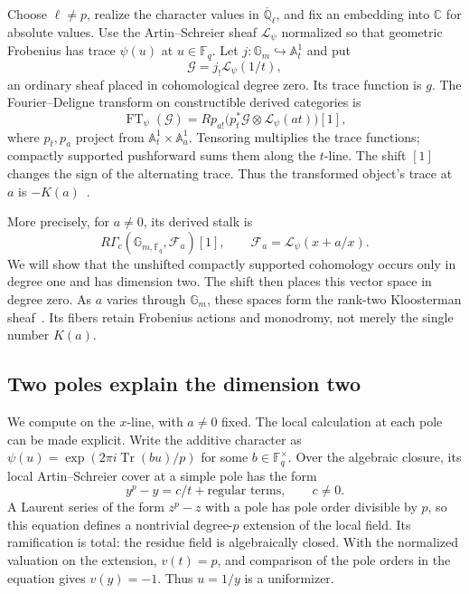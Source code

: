 \documentclass[11pt]{article}
\theoremstyle{remark}
\begin{document}
Choose \(\ell\ne p\), realize the character values in \(\overline{\mathbb Q}_\ell\), and fix an embedding into \(\mathbb C\) for absolute values. Use the Artin--Schreier sheaf \(\mathcal L_\psi\) normalized so that geometric Frobenius has trace \(\psi(u)\) at \(u\in\mathbb F_q\). Let \(j:\mathbb G_m\hookrightarrow\mathbb A^1_t\) and put
\[
\mathcal G=j_!\mathcal L_\psi(1/t),
\]
an ordinary sheaf placed in cohomological degree zero. Its trace function is \(g\). The Fourier--Deligne transform on constructible derived categories is
\begin{equation}
\operatorname{FT}_\psi(\mathcal G)
=Rp_{a!}\bigl(p_t^*\mathcal G\otimes
\mathcal L_\psi(at)\bigr)[1],
\label{estimate:fourier-deligne}
\end{equation}
where \(p_t,p_a\) project from \(\mathbb A^1_t\times\mathbb A^1_a\). Tensoring multiplies the trace functions; compactly supported pushforward sums them along the \(t\)-line. The shift \([1]\) changes the sign of the alternating trace. Thus the transformed object's trace at \(a\) is \(-K(a)\)~\cite{laumon}.

More precisely, for \(a\ne0\), its derived stalk is
\begin{equation}
R\Gamma_c\!\left(\mathbb G_{m,\overline{\mathbb F}_q},
\mathcal F_a\right)[1],
\qquad
\mathcal F_a=\mathcal L_\psi(x+a/x).
\label{estimate:stalk}
\end{equation}
We will show that the unshifted compactly supported cohomology occurs only in degree one and has dimension two. The shift then places this vector space in degree zero. As \(a\) varies through \(\mathbb G_m\), these spaces form the rank-two Kloosterman sheaf~\cite{katz}. Its fibers retain Frobenius actions and monodromy, not merely the single number \(K(a)\).

\subsection{Two poles explain the dimension two}

We compute on the \(x\)-line, with \(a\ne0\) fixed. The local calculation at each pole can be made explicit. Write the additive character as \(\psi(u)=\exp(2\pi i\operatorname{Tr}(bu)/p)\) for some \(b\in\mathbb F_q^\times\). Over the algebraic closure, its local Artin--Schreier cover at a simple pole has the form
\[
y^p-y=c/t+\text{regular terms},\qquad c\ne0.
\]
A Laurent series of the form \(z^p-z\) with a pole has pole order divisible by \(p\), so this equation defines a nontrivial degree-\(p\) extension of the local field. Its ramification is total: the residue field is algebraically closed. With the normalized valuation on the extension, \(v(t)=p\), and comparison of the pole orders in the equation gives \(v(y)=-1\). Thus \(u=1/y\) is a uniformizer.
\end{document}
